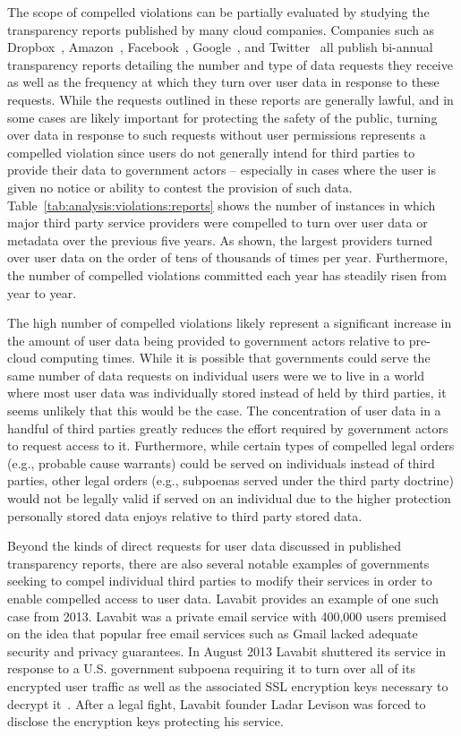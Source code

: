 The scope of compelled violations can be partially evaluated by
studying the transparency reports published by many cloud
companies. Companies such as Dropbox~\cite{dropbox-transparency},
Amazon~\cite{amazon-transparency},
Facebook~\cite{facebook-transparency},
Google~\cite{google-transparency}, and
Twitter~\cite{twitter-transparency} all publish bi-annual transparency
reports detailing the number and type of data requests they receive as
well as the frequency at which they turn over user data in response to
these requests. While the requests outlined in these reports are
generally lawful, and in some cases are likely important for
protecting the safety of the public, turning over data in response to
such requests without user permissions represents a compelled
violation since users do not generally intend for third parties to
provide their data to government actors -- especially in cases where
the user is given no notice or ability to contest the provision of
such data. Table~\ref{tab:analysis:violations:reports} shows the
number of instances in which major third party service providers were
compelled to turn over user data or metadata over the previous five
years. As shown, the largest providers turned over user data on the
order of tens of thousands of times per year. Furthermore, the number
of compelled violations committed each year has steadily risen from
year to year.

The high number of compelled violations likely represent a significant
increase in the amount of user data being provided to government
actors relative to pre-cloud computing times. While it is possible
that governments could serve the same number of data requests on
individual users were we to live in a world where most user data was
individually stored instead of held by third parties, it seems
unlikely that this would be the case. The concentration of user data
in a handful of third parties greatly reduces the effort required by
government actors to request access to it. Furthermore, while certain
types of compelled legal orders (e.g., probable cause warrants) could
be served on individuals instead of third parties, other legal orders
(e.g., subpoenas served under the third party doctrine) would not be
legally valid if served on an individual due to the higher protection
personally stored data enjoys relative to third party stored data.

Beyond the kinds of direct requests for user data discussed in
published transparency reports, there are also several notable
examples of governments seeking to compel individual third parties to
modify their services in order to enable compelled access to user
data. Lavabit provides an example of one such case from 2013. Lavabit
was a private email service with 400,000 users premised on the idea
that popular free email services such as Gmail lacked adequate
security and privacy guarantees. In August 2013 Lavabit shuttered its
service in response to a U.S. government subpoena requiring it to turn
over all of its encrypted user traffic as well as the associated SSL
encryption keys necessary to decrypt it~\cite{lavabit,
  levsion-lavabit}. After a legal fight, Lavabit founder Ladar Levison
was forced to disclose the encryption keys protecting his service.


